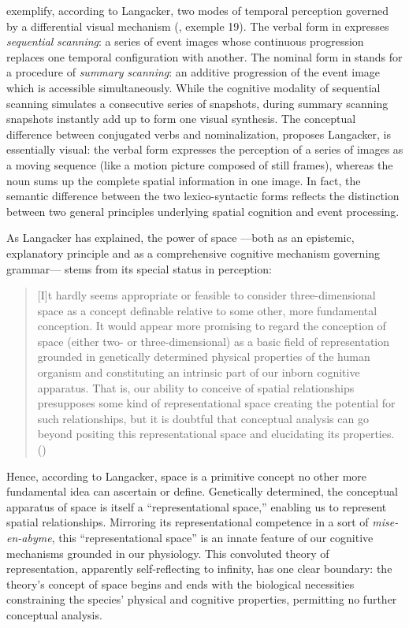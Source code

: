 \documentclass[output=paper]{langsci/langscibook}
\begin{document}
exemplify, according to Langacker, two modes of temporal perception governed by a differential visual mechanism (\citeyear[146]{langacker_foundations_1987}, exemple 19). The verbal form in  expresses \textit{sequential} \textit{scanning}: a series of event images whose continuous progression replaces one temporal configuration with another. The nominal form in  stands for a procedure of \textit{summary} \textit{scanning}: an additive progression of the event image which is accessible simultaneously. While the cognitive modality of sequential scanning simulates a consecutive series of snapshots, during summary scanning snapshots instantly add up to form one visual synthesis. The conceptual difference between conjugated verbs and nominalization, proposes Langacker, is essentially visual: the verbal form expresses the perception of a series of images as a moving sequence (like a motion picture composed of still frames), whereas the noun sums up the complete spatial information in one image. In fact, the semantic difference between the two lexico\nobreakdash-syntactic forms reflects the distinction between two general principles underlying spatial cognition and event processing.

As Langacker has explained, the power of space —both as an epistemic, explanatory principle and as a comprehensive cognitive mechanism governing grammar— stems from its special status in perception:

\begin{quote}

[I]t hardly seems appropriate or feasible to consider three-dimensional space as a concept definable relative to some other, more fundamental conception. It would appear more promising to regard the conception of space (either two- or three-dimensional) as a basic field of representation grounded in genetically determined physical properties of the human organism and constituting an intrinsic part of our inborn cognitive apparatus. That is, our ability to conceive of spatial relationships presupposes some kind of representational space creating the potential for such relationships, but it is doubtful that conceptual analysis can go beyond positing this representational space and elucidating its properties. (\citealt [148] {langacker_foundations_1987})

\end{quote}

Hence, according to Langacker, space is a primitive concept no other more fundamental idea can ascertain or define. Genetically determined, the conceptual apparatus of space is itself a “representational space,” enabling us to represent spatial relationships. Mirroring its representational competence in a sort of \textit{mise\nobreakdash-en\nobreakdash-abyme}, this “representational space” is an innate feature of our cognitive mechanisms grounded in our physiology. This convoluted theory of representation, apparently self-reflecting to infinity, has one clear boundary: the theory’s concept of space begins and ends with the biological necessities constraining the species’ physical and cognitive properties, permitting no further conceptual analysis. 
\end{document}
